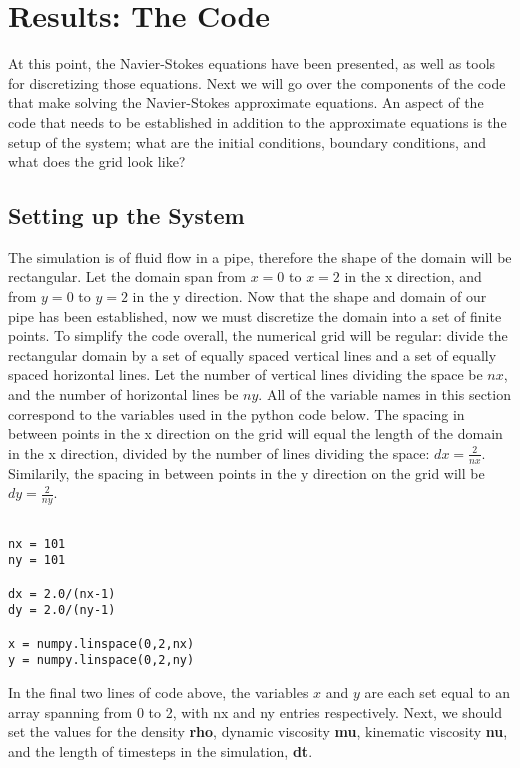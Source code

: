 \documentclass[twocolumn,12pth]{article}
\author{Aaron Scheets}
\begin{document}
\section{Results: The Code}

At this point, the Navier-Stokes equations have been presented, as well as tools for discretizing those equations.
Next we will go over the components of the code that make solving the Navier-Stokes approximate equations.
An aspect of the code that needs to be established in addition to the approximate equations is the setup of the system; what are the initial conditions, boundary conditions, and what does the grid look like?

\subsection{Setting up the System}

The simulation is of fluid flow in a pipe, therefore the shape of the domain will be rectangular.
Let the domain span from $x = 0$ to $x = 2$ in the x direction, and from $y = 0$ to $y = 2$ in the y direction.
Now that the shape and domain of our pipe has been established, now we must discretize the domain into a set of finite points.
To simplify the code overall, the numerical grid will be regular: divide the rectangular domain by a set of equally spaced vertical lines and a set of equally spaced horizontal lines.
Let the number of vertical lines dividing the space be $nx$, and the number of horizontal lines be $ny$.
All of the variable names in this section correspond to the variables used in the python code below.
The spacing in between points in the x direction on the grid will equal the length of the domain in the x direction, divided by the number of lines dividing the space: $dx = \frac{2}{nx}$.
Similarily, the spacing in between points in the y direction on the grid will be $dy = \frac{2}{ny}$. 

\begin{lstlisting}

nx = 101
ny = 101

dx = 2.0/(nx-1)
dy = 2.0/(ny-1)

x = numpy.linspace(0,2,nx)
y = numpy.linspace(0,2,ny)

\end{lstlisting}

In the final two lines of code above, the variables $x$ and $y$ are each set equal to an array spanning from 0 to 2, with nx and ny entries respectively. Next, we should set the values for the density \textbf{rho}, dynamic viscosity \textbf{mu}, kinematic viscosity \textbf{nu}, and the length of timesteps in the simulation, \textbf{dt}.
\end{document}
